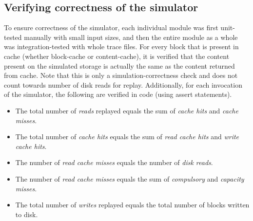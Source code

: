 \subsection{Verifying correctness of the simulator}
To ensure correctness of the simulator, each individual module was
first unit-tested manually with small input sizes, and then the entire
module as a whole was integration-tested with whole trace files. 
For every block that is present in cache (whether block-cache 
or content-cache), it is verified that the content present on the 
simulated storage is actually the same as the content returned from
cache. Note that this is only a simulation-correctness check and does not 
count towards number of disk reads for replay.
Additionally, for each invocation of the simulator, the following are 
verified in code (using assert statements).
\begin{itemize}
\item The total number of \textit{reads} replayed equals the sum of 
\textit{cache hits} and \textit{cache misses}.
\item The total number of \textit{cache hits} equals the sum of 
\textit{read cache hits} and \textit{write cache hits}.
\item The number of \textit{read cache misses} equals the number
of \textit{disk reads}.
\item The number of \textit{read cache misses} equals the sum of
\textit{compulsory} and \textit{capacity misses}.
\item The total number of \textit{writes} replayed equals the total number
of blocks written to disk.
\end{itemize}
